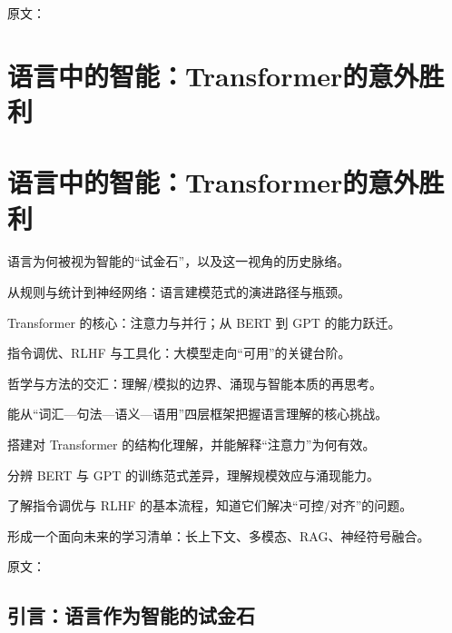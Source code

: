
原文：
\chapter{语言中的智能：Transformer的意外胜利}

\chapter{语言中的智能：Transformer的意外胜利}

\begin{introduction}
  \item 语言为何被视为智能的“试金石”，以及这一视角的历史脉络。
  \item 从规则与统计到神经网络：语言建模范式的演进路径与瓶颈。
  \item Transformer 的核心：注意力与并行；从 BERT 到 GPT 的能力跃迁。
  \item 指令调优、RLHF 与工具化：大模型走向“可用”的关键台阶。
  \item 哲学与方法的交汇：理解/模拟的边界、涌现与智能本质的再思考。
\end{introduction}

\begin{introduction}
  \item 能从“词汇—句法—语义—语用”四层框架把握语言理解的核心挑战。
  \item 搭建对 Transformer 的结构化理解，并能解释“注意力”为何有效。
  \item 分辨 BERT 与 GPT 的训练范式差异，理解规模效应与涌现能力。
  \item 了解指令调优与 RLHF 的基本流程，知道它们解决“可控/对齐”的问题。
  \item 形成一个面向未来的学习清单：长上下文、多模态、RAG、神经符号融合。
\end{introduction}


原文：
\section{引言：语言作为智能的试金石}

